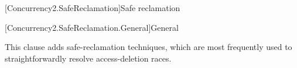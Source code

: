 
[Concurrency2.SafeReclamation]{Safe reclamation}

[Concurrency2.SafeReclamation.General]{General}

This clause adds safe-reclamation techniques, which are most frequently
used to straightforwardly resolve access-deletion races.
